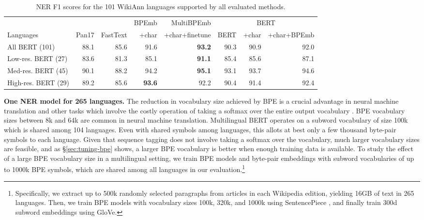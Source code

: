 \documentclass[11pt,a4paper]{article}
\newcommand\secref[1]{\S\ref{#1}}
\begin{document}
\begin{table*}[t!]
	\centering
	\small
	\begin{adjustbox}{max width=\linewidth}
		\begin{tabular}{lrr|rr|rrr}
\toprule

 & & & BPEmb & MultiBPEmb & \multicolumn{3}{|c}{BERT} \\
Languages & Pan17 & FastText & +char & +char+finetune & BERT & +char & +char+BPEmb \\

\midrule
All  BERT (101) & 88.1 & 85.6 & 91.6 & \textbf{93.2} & 90.3 & 90.9 & 92.0\\
Low-res.  BERT (27) & 83.6 & 81.3 & 85.1 & \textbf{91.1} & 85.4 & 85.6 & 87.1\\
Med-res.  BERT (45) & 90.1 & 88.2 & 94.2 & \textbf{95.1} & 93.1 & 93.7 & 94.6\\
High-res.  BERT (29) & 89.2 & 85.6 & \textbf{93.6} & 92.2 & 90.4 & 91.4 & 92.4\\
\bottomrule
\end{tabular}
 	\end{adjustbox}
	\caption{NER F1 scores for the 101 WikiAnn languages supported by all evaluated methods.}
	\label{tbl:wikiann-results-bert}
\end{table*}

\noindent\textbf{One NER model for 265 languages.} The reduction in vocabulary size achieved by BPE is a crucial advantage in neural machine translation \citep{johnson2017googles} and other tasks which involve the costly operation of taking a softmax over the entire output vocabulary \citep[see][]{morin2005hierarchical,li2019efficient}.
BPE vocabulary sizes between 8k and 64k are common in neural machine translation.
Multilingual BERT operates on a subword vocabulary of size 100k which is shared among 104 languages. Even with shared symbols among languages, this allots at best only a few thousand byte-pair symbols to each language.
Given that sequence tagging does not involve taking a softmax over the vocabulary, much larger vocabulary sizes are feasible, and as \secref{sec:tuning-bpe} shows, a larger BPE vocabulary is better when enough training data is available.
To study the effect of a large BPE vocabulary size in a multilingual setting, we train BPE models and byte-pair embeddings with subword vocabularies of up to 1000k BPE symbols, which are shared among all languages in our evaluation.\footnote{Specifically, we extract up to 500k randomly selected paragraphs from articles in each Wikipedia edition, yielding 16GB of text in 265 languages.
	Then, we train BPE models with vocabulary sizes 100k, 320k, and 1000k using SentencePiece \citep{kudo2018sentencepiece}, and finally train 300d subword embeddings using GloVe.}
\end{document}
